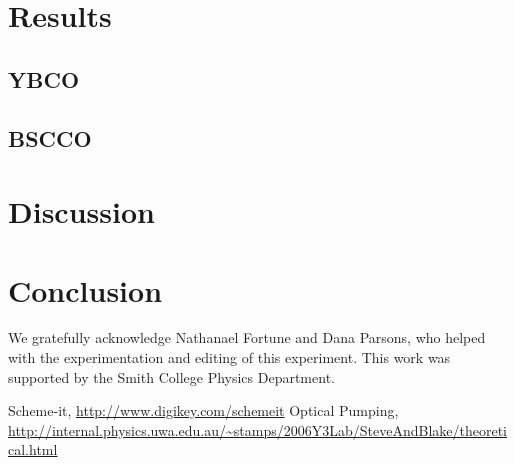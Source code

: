 \documentclass[prb,preprint]{revtex4-1}
\begin{document}
\section{Results}

\subsection{YBCO}

\subsection{BSCCO}



\section{Discussion}

\section{Conclusion}


\begin{acknowledgments}

We gratefully acknowledge Nathanael Fortune and Dana Parsons, who helped with the experimentation and editing of this experiment. This work was supported by the Smith College Physics Department.

\end{acknowledgments}


\begin{thebibliography}{99}

 Scheme-it, \url{http://www.digikey.com/schemeit}
 Optical Pumping, \url{http://internal.physics.uwa.edu.au/~stamps/2006Y3Lab/SteveAndBlake/theoretical.html}

\end{thebibliography}

\end{document}
